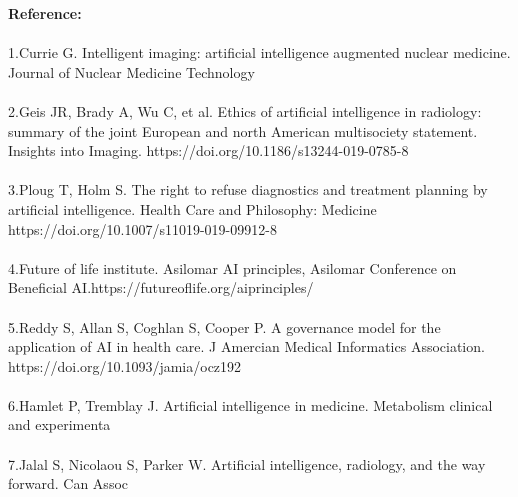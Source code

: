 \documentclass[12pt]{article}
\begin{document}
\noindent \textbf{\large Reference:} \\ \\  1.Currie G. Intelligent imaging: artificial intelligence augmented nuclear medicine. Journal of Nuclear
Medicine Technology\\ \\
 2.Geis JR, Brady A, Wu C, et al. Ethics of artificial intelligence in radiology: summary of the joint European and
north American multisociety statement. Insights into Imaging. https://doi.org/10.1186/s13244-019-0785-8\\ \\
 3.Ploug T, Holm S. The right to refuse diagnostics and treatment planning by artificial intelligence. Health
Care and Philosophy: Medicine https://doi.org/10.1007/s11019-019-09912-8\\ \\
 4.Future of life institute. Asilomar AI principles, Asilomar Conference on Beneficial
AI.https://futureoflife.org/aiprinciples/\\ \\ 5.Reddy S, Allan S, Coghlan S, Cooper P. A governance model for the application of AI in health care. J
Amercian Medical Informatics Association. https://doi.org/10.1093/jamia/ocz192\\ \\
 6.Hamlet P, Tremblay J. Artificial intelligence in medicine. Metabolism clinical and experimenta\\ \\
 7.Jalal S, Nicolaou S, Parker W. Artificial intelligence, radiology, and the way forward. Can Assoc\\ \\

\end{document}
